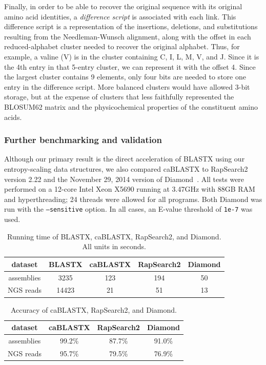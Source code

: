 \documentclass[review,preprint,12pt]{elsarticle}
\renewcommand{\cite}{\citep} %
\theoremstyle{definition}
\theoremstyle{remark}
\numberwithin{equation}{section}
\begin{document}
Finally, in order to be able to recover the original sequence with its original
amino acid identities, a \textit{difference script} is associated with each
link.
This difference script is a representation of the insertions, deletions, and
substitutions resulting from the Needleman-Wunsch alignment, along with the
offset in each reduced-alphabet cluster needed to recover the original alphabet.
Thus, for example, a valine (V) is in the cluster containing C, I, L, M, V, and 
J.
Since it is the 4th entry in that 5-entry cluster, we can represent it with
the offset 4.
Since the largest cluster contains 9 elements, only four bits are needed to
store one entry in the difference script.
More balanced clusters would have allowed 3-bit storage, but at the expense of
clusters that less faithfully represented the BLOSUM62 matrix and the
physicochemical properties of the constituent amino acids.

\subsubsection{Further benchmarking and validation}

Although our primary result is the direct acceleration of BLASTX using our
entropy-scaling data structures, we also compared caBLASTX to 
RapSearch2~\cite{zhao2012rapsearch2} version 2.22 and the November 29, 2014 
version of Diamond~\cite{buchfink2014fast}.
All tests were performed on a 12-core Intel Xeon X5690 running at 3.47GHz with
88GB RAM and hyperthreading; 24 threads were allowed for all programs.
Both Diamond was run with the \texttt{--sensitive} option.
In all cases, an E-value threshold of \texttt{1e-7} was used.

\begin{table}
\caption{Running time of BLASTX, caBLASTX, RapSearch2, and Diamond. All units in seconds.\label{mgspeed}}
\begin{tabular}{ccccc}
\hline
dataset & BLASTX & caBLASTX & RapSearch2 & Diamond \\
\hline
assemblies & 3235 & 123 & 194 & 50 \\
\hline
NGS reads & 14423 & 21 & 51 & 13 \\
\hline
\end{tabular}
\end{table}

\begin{table}
\caption{Accuracy of caBLASTX, RapSearch2, and Diamond.\label{mgacc}}
\begin{tabular}{cccc}
\hline
dataset & caBLASTX & RapSearch2 & Diamond \\
\hline
assemblies & 99.2\% & 87.7\% & 91.0\% \\
\hline
NGS reads & 95.7\% & 79.5\% & 76.9\% \\
\hline
\end{tabular}
\end{table}
\end{document}
